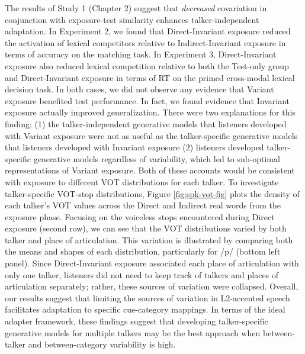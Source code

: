 \documentclass[
  12pt,
  twoside]{article}
\begin{document}
The results of Study 1 (Chapter 2) suggest that \emph{decreased} covariation in conjunction with exposure-test similarity enhances talker-independent adaptation.
In Experiment 2, we found that Direct-Invariant exposure reduced the activation of lexical competitors relative to Indirect-Invariant exposure in terms of accuracy on the matching task.
In Experiment 3, Direct-Invariant exposure also reduced lexical competition relative to both the Test-only group and Direct-Invariant exposure in terms of RT on the primed cross-modal lexical decision task.
In both cases, we did not observe any evidence that Variant exposure benefited test performance.
In fact, we found evidence that Invariant exposure actually improved generalization.
There were two explanations for this finding: (1) the talker-independent generative models that listeners developed with Variant exposure were not as useful as the talker-specific generative models that listeners developed with Invariant exposure (2) listeners developed talker-specific generative models regardless of variability, which led to sub-optimal representations of Variant exposure.
Both of these accounts would be consistent with exposure to different VOT distributions for each talker.
To investigate talker-specific VOT-stop distributions, Figure \ref{fig:spk-vot-fig} plots the density of each talker's VOT values across the Direct and Indirect real words from the exposure phase.
Focusing on the voiceless stops encountered during Direct exposure (second row), we can see that the VOT distributions varied by both talker and place of articulation.
This variation is illustrated by comparing both the means and shapes of each distribution, particularly for /p/ (bottom left panel).
Since Direct-Invariant exposure associated each place of articulation with only one talker, listeners did not need to keep track of talkers and places of articulation separately; rather, these sources of variation were collapsed.
Overall, our results suggest that limiting the sources of variation in L2-accented speech facilitates adaptation to specific cue-category mappings.
In terms of the ideal adapter framework, these findings suggest that developing talker-specific generative models for multiple talkers may be the best approach when between-talker and between-category variability is high.
\end{document}
